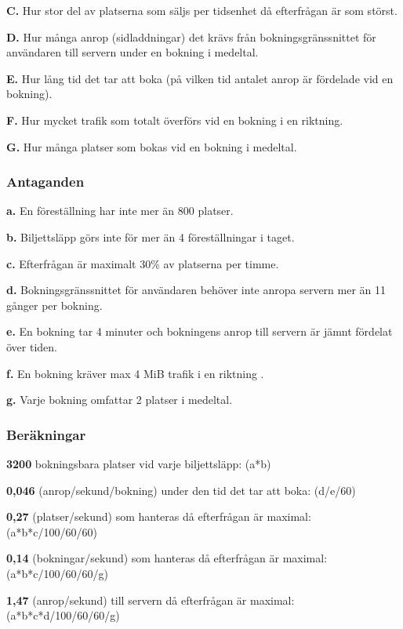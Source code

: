 \documentclass[a4paper, twoside, 11pt, titlepage]{article}
\begin{document}
		\textbf{C.} Hur stor del av platserna som säljs per tidsenhet då efterfrågan är som störst.

		\textbf{D.} Hur många anrop (sidladdningar) det krävs från bokningsgränssnittet för användaren till servern under en bokning i medeltal.

		\textbf{E.} Hur lång tid det tar att boka (på vilken tid antalet anrop är fördelade vid en bokning).

		\textbf{F.} Hur mycket trafik som totalt överförs vid en bokning i en riktning.

		\textbf{G.} Hur många platser som bokas vid en bokning i medeltal.

		\subsubsection{Antaganden}


		\textbf{a.} En föreställning har inte mer än 800 platser.

		\textbf{b.} Biljettsläpp görs inte för mer än 4 föreställningar i taget.

		\textbf{c.} Efterfrågan är maximalt 30\% av platserna per timme.

		\textbf{d.} Bokningsgränssnittet för användaren behöver inte anropa servern mer än 11 gånger per bokning.

		\textbf{e.} En bokning tar 4 minuter och bokningens anrop till servern är jämnt fördelat över tiden. 

		\textbf{f.} En bokning kräver max 4 MiB trafik i en riktning .

		\textbf{g.} Varje bokning omfattar 2 platser i medeltal.

		\subsubsection{Beräkningar}


		\textbf{3200} bokningsbara platser vid varje biljettsläpp: (a*b)

		\textbf{0,046} (anrop/sekund/bokning) under den tid det tar att boka: (d/e/60)

		\textbf{0,27} (platser/sekund) som hanteras då efterfrågan är maximal: (a*b*c/100/60/60)

		\textbf{0,14} (bokningar/sekund) som hanteras då efterfrågan är maximal: (a*b*c/100/60/60/g)

		\textbf{1,47} (anrop/sekund) till servern då efterfrågan är maximal: (a*b*c*d/100/60/60/g)
\end{document}
